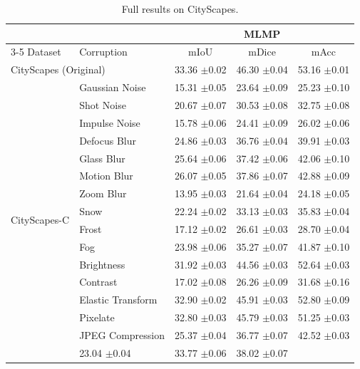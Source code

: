 \documentclass{article}
\begin{document}
\begin{table}[t]
\centering
\caption{Full results on CityScapes.}
\label{tab:results_cityscapes}
\begin{tabular}{ll|ccc}
\toprule
 & & \multicolumn{3}{c}{MLMP} \\
\cmidrule(lr){3-5}
Dataset & Corruption & mIoU & mDice & mAcc \\
\midrule
\multicolumn{2}{l}{CityScapes (Original)} & 33.36 {\scriptsize $\pm$0.02} & 46.30 {\scriptsize $\pm$0.04} & 53.16 {\scriptsize $\pm$0.01} \\
\multirow{16}{*}{CityScapes-C} & Gaussian Noise & 15.31 {\scriptsize $\pm$0.05} & 23.64 {\scriptsize $\pm$0.09} & 25.23 {\scriptsize $\pm$0.10} \\
 & Shot Noise & 20.67 {\scriptsize $\pm$0.07} & 30.53 {\scriptsize $\pm$0.08} & 32.75 {\scriptsize $\pm$0.08} \\
 & Impulse Noise & 15.78 {\scriptsize $\pm$0.06} & 24.41 {\scriptsize $\pm$0.09} & 26.02 {\scriptsize $\pm$0.06} \\
 & Defocus Blur & 24.86 {\scriptsize $\pm$0.03} & 36.76 {\scriptsize $\pm$0.04} & 39.91 {\scriptsize $\pm$0.03} \\
 & Glass Blur & 25.64 {\scriptsize $\pm$0.06} & 37.42 {\scriptsize $\pm$0.06} & 42.06 {\scriptsize $\pm$0.10} \\
 & Motion Blur & 26.07 {\scriptsize $\pm$0.05} & 37.86 {\scriptsize $\pm$0.07} & 42.88 {\scriptsize $\pm$0.09} \\
 & Zoom Blur & 13.95 {\scriptsize $\pm$0.03} & 21.64 {\scriptsize $\pm$0.04} & 24.18 {\scriptsize $\pm$0.05} \\
 & Snow & 22.24 {\scriptsize $\pm$0.02} & 33.13 {\scriptsize $\pm$0.03} & 35.83 {\scriptsize $\pm$0.04} \\
 & Frost & 17.12 {\scriptsize $\pm$0.02} & 26.61 {\scriptsize $\pm$0.03} & 28.70 {\scriptsize $\pm$0.04} \\
 & Fog & 23.98 {\scriptsize $\pm$0.06} & 35.27 {\scriptsize $\pm$0.07} & 41.87 {\scriptsize $\pm$0.10} \\
 & Brightness & 31.92 {\scriptsize $\pm$0.03} & 44.56 {\scriptsize $\pm$0.03} & 52.64 {\scriptsize $\pm$0.03} \\
 & Contrast & 17.02 {\scriptsize $\pm$0.08} & 26.26 {\scriptsize $\pm$0.09} & 31.68 {\scriptsize $\pm$0.16} \\
 & Elastic Transform & 32.90 {\scriptsize $\pm$0.02} & 45.91 {\scriptsize $\pm$0.03} & 52.80 {\scriptsize $\pm$0.09} \\
 & Pixelate & 32.80 {\scriptsize $\pm$0.03} & 45.79 {\scriptsize $\pm$0.03} & 51.25 {\scriptsize $\pm$0.03} \\
 & JPEG Compression & 25.37 {\scriptsize $\pm$0.04} & 36.77 {\scriptsize $\pm$0.07} & 42.52 {\scriptsize $\pm$0.03} \\
\cmidrule(l){2-5}
\multicolumn{2}{l}{\textit{CityScapes-C Average}} & 23.04 {\scriptsize $\pm$0.04} & 33.77 {\scriptsize $\pm$0.06} & 38.02 {\scriptsize $\pm$0.07} \\
\bottomrule
\end{tabular}
\end{table}
\end{document}
